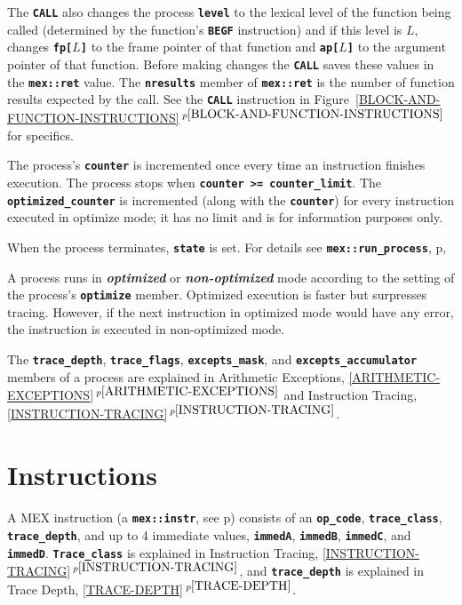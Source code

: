 \documentclass[12pt]{article}
\newcommand{\TT}[1]{{\tt \bfseries #1}}
\newcommand{\key}[1]{{\bf \em #1}\index{#1}}
\newcommand{\itemref}[1]{\ref{#1}$\,^{p\pageref{#1}}$}
\newcommand{\pagref}[1]{p\pageref{#1}}
\newcommand{\EOL}{\penalty \exhyphenpenalty}
\begin{document}
The \TT{CALL} also changes the process \TT{level} to the lexical level
of the function being called (determined by the function's \TT{BEGF}
instruction) and if this level is $L$, changes \TT{fp[$L$]} to the
frame pointer of that function and \TT{ap[$L$]} to the argument pointer
of that function.  Before making changes the \TT{CALL}
saves these values in the \TT{mex::ret} value.
The \TT{nresults} member of \TT{mex::ret}
is the number of function results expected by the call.
See the \TT{CALL} instruction in
Figure~\itemref{BLOCK-AND-FUNCTION-INSTRUCTIONS}
for specifics.

The process's \TT{counter} is incremented once every time an instruction
finishes execution.  The process stops when
\TT{counter >= counter\_\EOL limit}\label{COUNTER-LIMIT}.
The \TT{optimized\_counter}
is incremented (along with the \TT{counter})
for every instruction executed in optimize mode;
it has no limit and is for information purposes only.

When the process terminates, \TT{state} is set.  For details
see \TT{mex::run\_process}, \pagref{MEX::RUN_PROCESS},

A process runs in \key{optimized} or \key{non-optimized} mode
according to the setting of the process's \TT{optimize} member.
Optimized execution is faster but surpresses tracing.
However, if the next instruction in optimized mode would have
any error, the instruction is executed in non-optimized mode.

The \TT{trace\_depth}, \TT{trace\_flags}, \TT{excepts\_mask}, and
\TT{excepts\_accumulator}
members of a process
are explained in Arithmetic Exceptions, \itemref{ARITHMETIC-EXCEPTIONS}
and Instruction Tracing, \itemref{INSTRUCTION-TRACING}.


\section{Instructions}
\label{INSTRUCTIONS}

A MEX instruction (a \TT{mex::instr}, see \pagref{MEX::INSTR})
consists of an \TT{op\_code}, \TT{trace\_class}, \TT{trace\_\EOL depth},
and up to 4 immediate values,
\TT{immedA}, \TT{immedB}, \TT{immedC}, and \TT{immedD}.
\TT{Trace\_class} is explained in Instruction Tracing,
\itemref{INSTRUCTION-TRACING}, and
\TT{trace\_depth} is explained in Trace Depth,
\itemref{TRACE-DEPTH}.
\end{document}
